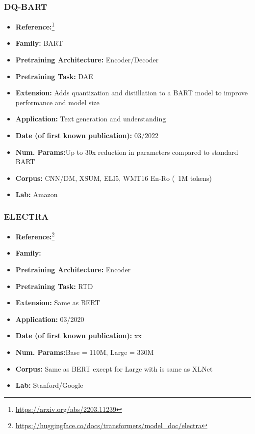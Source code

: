 \documentclass{article}
\begin{document}
\subsubsection{DQ-BART}

            \begin{itemize}
                \item \textbf{Reference:}\footnote{\url{https://arxiv.org/abs/2203.11239}}\cite{li2022dq}
                \item \textbf{Family:} BART 
                \item \textbf{Pretraining Architecture:} Encoder/Decoder
                \item \textbf{Pretraining Task:} DAE
                \item \textbf{Extension:} Adds quantization and distillation to a BART model to improve performance and model size  
                \item \textbf{Application:} Text generation and understanding
                \item \textbf{Date (of first known publication):} 03/2022
                \item \textbf{Num. Params:}Up to 30x reduction in parameters compared to standard BART
                \item \textbf{Corpus:} CNN/DM, XSUM, ELI5, WMT16 En-Ro (~1M tokens)
                \item \textbf{Lab:} Amazon
            \end{itemize}

\subsubsection{ELECTRA}

            \begin{itemize}
                \item \textbf{Reference:}\footnote{\url{https://huggingface.co/docs/transformers/model_doc/electra}}\cite{clark2020electra}
                \item \textbf{Family:} 
                \item \textbf{Pretraining Architecture:} Encoder
                \item \textbf{Pretraining Task:} RTD
                \item \textbf{Extension:} Same as BERT  
                \item \textbf{Application:} 03/2020
                \item \textbf{Date (of first known publication):} xx
                \item \textbf{Num. Params:}Base = 110M, Large = 330M
                \item \textbf{Corpus:} Same as BERT except for Large with is same as XLNet
                \item \textbf{Lab:} Stanford/Google
            \end{itemize}
\end{document}
